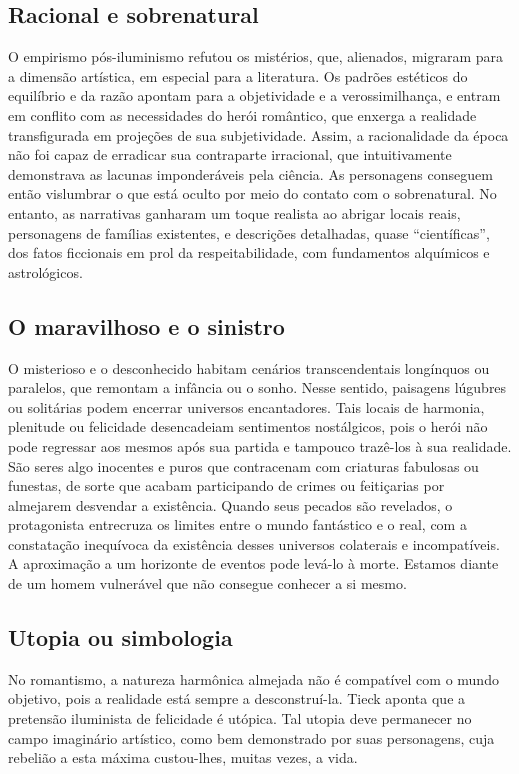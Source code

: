 \documentclass[12pt]{extarticle}
\begin{document}
\subsection{Racional e sobrenatural}

O empirismo pós-iluminismo refutou os mistérios, que, alienados,
migraram para a dimensão artística, em especial para a literatura. Os
padrões estéticos do equilíbrio e da razão apontam para a objetividade e
a verossimilhança, e entram em conflito com as necessidades do herói
romântico, que enxerga a realidade transfigurada em projeções de sua
subjetividade. Assim, a racionalidade da época não foi capaz de
erradicar sua contraparte irracional, que intuitivamente demonstrava as
lacunas imponderáveis pela ciência. As personagens conseguem então
vislumbrar o que está oculto por meio do contato com o sobrenatural. No
entanto, as narrativas ganharam um toque realista ao abrigar locais
reais, personagens de famílias existentes, e descrições detalhadas,
quase ``científicas'', dos fatos ficcionais em prol da respeitabilidade,
com fundamentos alquímicos e astrológicos.

\subsection{O maravilhoso e o sinistro}

O misterioso e o desconhecido habitam cenários transcendentais
longínquos ou paralelos, que remontam a infância ou o sonho. Nesse
sentido, paisagens lúgubres ou solitárias podem encerrar universos
encantadores. Tais locais de harmonia, plenitude ou felicidade
desencadeiam sentimentos nostálgicos, pois o herói não pode regressar
aos mesmos após sua partida e tampouco trazê-los à sua realidade. São
seres algo inocentes e puros que contracenam com criaturas fabulosas ou
funestas, de sorte que acabam participando de crimes ou feitiçarias por
almejarem desvendar a existência. Quando seus pecados são revelados, o
protagonista entrecruza os limites entre o mundo fantástico e o real,
com a constatação inequívoca da existência desses universos colaterais e
incompatíveis. A aproximação a um horizonte de eventos pode levá-lo à
morte. Estamos diante de um homem vulnerável que não consegue conhecer a
si mesmo.

\subsection{Utopia ou simbologia}

No romantismo, a natureza harmônica almejada não é compatível com o
mundo objetivo, pois a realidade está sempre a desconstruí-la. Tieck
aponta que a pretensão iluminista de felicidade é utópica. Tal utopia
deve permanecer no campo imaginário artístico, como bem demonstrado por
suas personagens, cuja rebelião a esta máxima custou-lhes, muitas vezes,
a vida.
\end{document}
